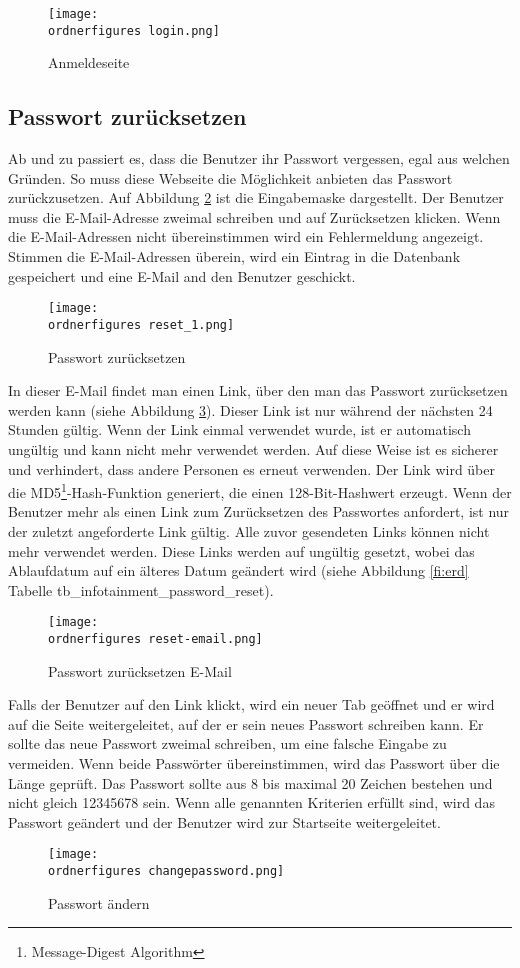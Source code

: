 \begin{figure}[H]
	\centering
	\texttt{[image: \\ordnerfigures login.png]}
	\caption{Anmeldeseite}
	\label{fi:login}
\end{figure}

\subsection{Passwort zurücksetzen}
Ab und zu passiert es, dass die Benutzer ihr Passwort vergessen, egal aus welchen Gründen. So muss diese Webseite die Möglichkeit anbieten das Passwort zurückzusetzen. Auf Abbildung \ref{fi:reset} ist die Eingabemaske dargestellt. Der Benutzer muss die E-Mail-Adresse zweimal schreiben und auf Zurücksetzen klicken. Wenn die E-Mail-Adressen nicht übereinstimmen wird ein Fehlermeldung angezeigt. Stimmen die E-Mail-Adressen überein, wird ein Eintrag in die Datenbank gespeichert und eine E-Mail and den Benutzer geschickt.
\begin{figure}[H]
	\centering
	\texttt{[image: \\ordnerfigures reset\_1.png]}
	\caption{Passwort zurücksetzen}
	\label{fi:reset}
\end{figure}

In dieser E-Mail findet man einen Link, über den man das Passwort zurücksetzen werden kann (siehe Abbildung \ref{fi:resetemail}). Dieser Link ist nur während der nächsten 24 Stunden gültig. Wenn der Link einmal verwendet wurde, ist er automatisch ungültig und kann nicht mehr verwendet werden. Auf diese Weise ist es sicherer und verhindert, dass andere Personen es erneut verwenden. Der Link wird über die MD5\footnote{Message-Digest Algorithm }-Hash-Funktion generiert, die einen 128-Bit-Hashwert erzeugt. Wenn der Benutzer mehr als einen Link zum Zurücksetzen des Passwortes anfordert, ist nur der zuletzt angeforderte Link gültig. Alle zuvor gesendeten Links können nicht mehr verwendet werden. Diese Links werden auf ungültig gesetzt, wobei das Ablaufdatum auf ein älteres Datum geändert wird (siehe Abbildung \ref{fi:erd} Tabelle tb\_infotainment\_password\_reset). 

\begin{figure}[H]
	\centering
	\texttt{[image: \\ordnerfigures reset-email.png]}
	\caption{Passwort zurücksetzen E-Mail}
	\label{fi:resetemail}
\end{figure}

Falls der Benutzer auf den Link klickt, wird ein neuer Tab geöffnet und er wird auf die Seite weitergeleitet, auf der er sein neues Passwort schreiben kann. Er sollte das neue Passwort zweimal schreiben, um eine falsche Eingabe zu vermeiden. Wenn beide Passwörter übereinstimmen, wird das Passwort über die Länge geprüft. Das Passwort sollte aus 8 bis maximal 20 Zeichen bestehen und nicht gleich 12345678 sein.
Wenn alle genannten Kriterien erfüllt sind, wird das Passwort geändert und der Benutzer wird zur Startseite weitergeleitet.
\begin{figure}[H]
	\centering
	\texttt{[image: \\ordnerfigures changepassword.png]}
	\caption{Passwort ändern}
	\label{fi:reset-password}
\end{figure}

